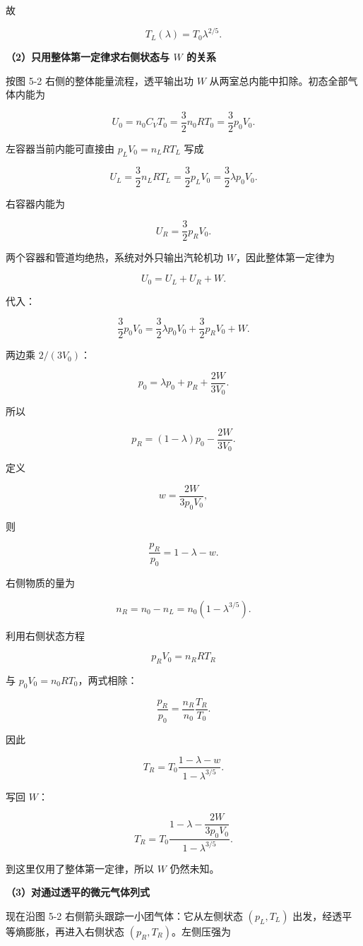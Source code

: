 \documentclass[12pt,a4paper,UTF8]{ctexart}
\begin{document}
故

\[\boxed{T_L(\lambda)=T_0\lambda^{2/5}}.\]

\textbf{（2）只用整体第一定律求右侧状态与 \(W\) 的关系}

按图 5-2 右侧的整体能量流程，透平输出功 \(W\)
从两室总内能中扣除。初态全部气体内能为

\[
U_0=n_0C_VT_0
=\frac32n_0RT_0
=\frac32p_0V_0.
\]

左容器当前内能可直接由 \(p_LV_0=n_LRT_L\) 写成

\[
U_L=\frac32n_LRT_L
=\frac32p_LV_0
=\frac32\lambda p_0V_0.
\]

右容器内能为

\[U_R=\frac32p_RV_0.\]

两个容器和管道均绝热，系统对外只输出汽轮机功 \(W\)，因此整体第一定律为

\[U_0=U_L+U_R+W.\]

代入：

\[
\frac32p_0V_0
=\frac32\lambda p_0V_0
+\frac32p_RV_0+W.
\]

两边乘 \(2/(3V_0)\)：

\[p_0=\lambda p_0+p_R+\frac{2W}{3V_0}.\]

所以

\[
\boxed{
p_R=(1-\lambda)p_0-\frac{2W}{3V_0}
}.
\]

定义

\[w=\frac{2W}{3p_0V_0},\]

则

\[
\boxed{\frac{p_R}{p_0}=1-\lambda-w}.
\]

右侧物质的量为

\[
n_R=n_0-n_L
=n_0(1-\lambda^{3/5}).
\]

利用右侧状态方程

\[p_RV_0=n_RRT_R\]

与 \(p_0V_0=n_0RT_0\)，两式相除：

\[
\frac{p_R}{p_0}
=\frac{n_R}{n_0}\frac{T_R}{T_0}.
\]

因此

\[
\boxed{
T_R=T_0\frac{1-\lambda-w}{1-\lambda^{3/5}}
}.
\]

写回 \(W\)：

\[
\boxed{
T_R=T_0
\frac{1-\lambda-\dfrac{2W}{3p_0V_0}}
{1-\lambda^{3/5}}
}.
\]

到这里仅用了整体第一定律，所以 \(W\) 仍然未知。

\textbf{（3）对通过透平的微元气体列式}

现在沿图 5-2 右侧箭头跟踪一小团气体：它从左侧状态 \((p_L,T_L)\)
出发，经透平等熵膨胀，再进入右侧状态 \((p_R,T_R)\)。左侧压强为
\end{document}
